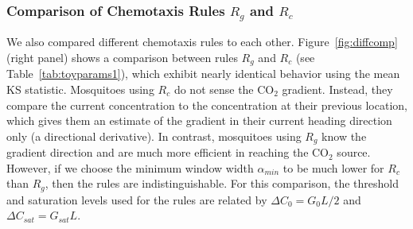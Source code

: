 \documentclass[12pt]{article}
\begin{document}
\subsubsection{Comparison of Chemotaxis Rules $R_g$ and $R_c$}

We also compared different chemotaxis rules to each other. Figure~\ref{fig:diffcomp} (right panel) shows a comparison between rules $R_g$ and $R_c$ (see Table~\ref{tab:toyparams1}), which exhibit nearly identical behavior using the mean KS statistic. Mosquitoes using $R_c$ do not sense the CO$_2$ gradient. Instead, they compare the current concentration to the concentration at their previous location, which gives them an estimate of the gradient in their
current heading direction only (a directional derivative). In contrast, mosquitoes using $R_g$ know the gradient direction and are much more efficient in reaching the CO$_2$ source. However, if we choose the minimum window width $\alpha_{min}$ to be much lower for $R_c$ than $R_g$, then the rules are indistinguishable. For this comparison, the threshold and saturation levels used for the rules are related by $\Delta C_0 = G_0L/2$ and $\Delta C_{sat} = G_{sat}L$.
\end{document}
